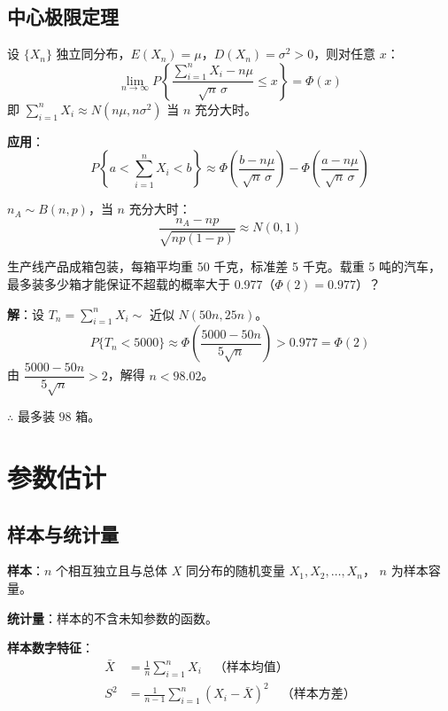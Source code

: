\documentclass[12pt, a4paper]{article}
\begin{document}
\subsection{中心极限定理}

\begin{tcolorbox}[thmbox, title={列维-林德伯格定理（独立同分布 CLT）}]
    设 $\{X_n\}$ 独立同分布，$E(X_n)=\mu$，$D(X_n)=\sigma^2>0$，则对任意 $x$：
    \[
        \lim_{n\to\infty}P\!\left\{\frac{\sum_{i=1}^n X_i - n\mu}{\sqrt{n}\,\sigma}\le x\right\}
        =\Phi(x)
    \]
    即 $\sum_{i=1}^n X_i\approx N(n\mu,n\sigma^2)$ 当 $n$ 充分大时。

    \textbf{应用}：
    \[
        P\!\left\{a<\sum_{i=1}^n X_i<b\right\}\approx
        \Phi\!\left(\frac{b-n\mu}{\sqrt{n}\,\sigma}\right)
        -\Phi\!\left(\frac{a-n\mu}{\sqrt{n}\,\sigma}\right)
    \]
\end{tcolorbox}

\begin{tcolorbox}[thmbox, title={棣莫弗-拉普拉斯定理}]
    $n_A\sim B(n,p)$，当 $n$ 充分大时：
    \[
        \frac{n_A - np}{\sqrt{np(1-p)}}\approx N(0,1)
    \]
\end{tcolorbox}

\begin{tcolorbox}[exbox, title={CLT 应用例题}]
    生产线产品成箱包装，每箱平均重 50 千克，标准差 5 千克。载重 5 吨的汽车，
    最多装多少箱才能保证不超载的概率大于 0.977（$\Phi(2)=0.977$）？

    \textbf{解}：设 $T_n=\sum_{i=1}^n X_i\sim$ 近似 $N(50n, 25n)$。
    \[
        P\{T_n<5000\}\approx\Phi\!\left(\frac{5000-50n}{5\sqrt{n}}\right)>0.977=\Phi(2)
    \]
    由 $\dfrac{5000-50n}{5\sqrt{n}}>2$，解得 $n<98.02$。

    $\therefore$ 最多装 $\boxed{98}$ 箱。
\end{tcolorbox}

\section{参数估计}

\subsection{样本与统计量}

\begin{tcolorbox}[defbox, title={基本概念}]
    \textbf{样本}：$n$ 个相互独立且与总体 $X$ 同分布的随机变量 $X_1,X_2,\ldots,X_n$，
    $n$ 为样本容量。

    \textbf{统计量}：样本的不含未知参数的函数。

    \textbf{样本数字特征}：
    \begin{align*}
        \bar{X} & = \frac{1}{n}\sum_{i=1}^n X_i \quad\text{（样本均值）}              \\[4pt]
        S^2     & = \frac{1}{n-1}\sum_{i=1}^n(X_i-\bar{X})^2 \quad\text{（样本方差）}
    \end{align*}
\end{tcolorbox}
\end{document}
